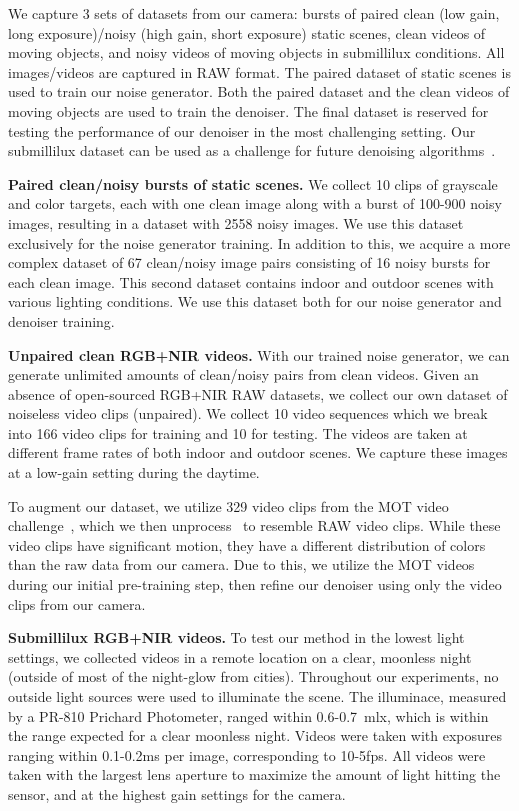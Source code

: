 \documentclass[final]{cvpr}
\begin{document}
We capture 3 sets of datasets from our camera: bursts of paired clean (low gain, long exposure)/noisy (high gain, short exposure) static scenes, clean videos of moving objects, and noisy videos of moving objects in submillilux conditions. All images/videos are captured in RAW format. The paired dataset of static scenes is used to train our noise generator. Both the paired dataset and the clean videos of moving objects are used to train the denoiser. The final dataset is reserved for testing the performance of our denoiser in the most challenging setting. Our submillilux dataset can be used as a challenge for future denoising algorithms~\cite{starlightdataset}. 


\vspace{1mm}\noindent\textbf{Paired clean/noisy bursts of static scenes.}
We collect 10 clips of grayscale and color targets, each with one clean image along with a burst of 100-900 noisy images, resulting in a dataset with 2558 noisy images.  We use this dataset exclusively for the noise generator training. In addition to this, we acquire a more complex dataset of 67 clean/noisy image pairs consisting of 16 noisy bursts for each clean image. This second dataset contains indoor and outdoor scenes with various lighting conditions. We use this dataset both for our noise generator and denoiser training. 

\vspace{1mm}\noindent\textbf{Unpaired clean RGB+NIR videos.}
With our trained noise generator, we can generate unlimited amounts of clean/noisy pairs from clean videos. Given an absence of open-sourced RGB+NIR RAW datasets, we collect our own dataset of noiseless video clips (unpaired). We collect 10 video sequences which we break into 166 video clips for training and 10 for testing. The videos are taken at different frame rates of both indoor and outdoor scenes. We capture these images at a low-gain setting during the daytime.

To augment our dataset, we utilize 329 video clips from the MOT video challenge~\cite{leal2015motchallenge}, which we then unprocess~\cite{brooks2019unprocessing} to resemble RAW video clips. While these video clips have significant motion, they have a different distribution of colors than the raw data from our camera. Due to this, we utilize the MOT videos during our initial pre-training step, then refine our denoiser using only the video clips from our camera. 

\vspace{1mm}\noindent\textbf{Submillilux RGB+NIR videos.}
To test our method in the lowest light settings, we collected videos in a remote location on a clear, moonless night (outside of most of the night-glow from cities). Throughout our experiments, no outside light sources were used to illuminate the scene. The illuminace, measured by a PR-810 Prichard Photometer, ranged within 0.6-0.7~\si{\milli\lux}, which is within the range expected for a clear moonless night. Videos were taken with exposures ranging within 0.1-0.2\si{\milli\second} per image, corresponding to 10-5fps. All videos were taken with the largest lens aperture to maximize the amount of light hitting the sensor, and at the highest gain settings for the camera.
\end{document}
